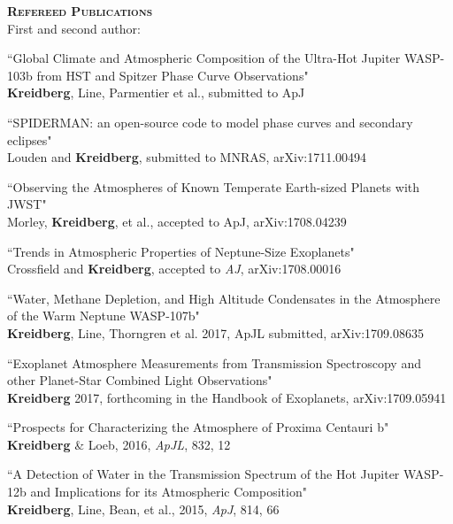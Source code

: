 \documentclass[12pt,letterpaper]{article}
\begin{document}
\textbf{\textsc{Refereed Publications}} \\
\vspace{1mm}
\hspace*{5mm}First and second author:
\begin{compactenum}
\item ``Global Climate and Atmospheric Composition of the Ultra-Hot Jupiter WASP-103b from HST and Spitzer Phase Curve Observations"\\
\textbf{Kreidberg}, Line, Parmentier et al., submitted to ApJ

\item ``SPIDERMAN: an open-source code to model phase curves and secondary eclipses"\\
Louden and \textbf{Kreidberg}, submitted to MNRAS, arXiv:1711.00494

\item ``Observing the Atmospheres of Known Temperate Earth-sized Planets with JWST"\\
Morley, \textbf{Kreidberg}, et al., accepted to ApJ, arXiv:1708.04239

\item ``Trends in Atmospheric Properties of Neptune-Size Exoplanets"\\
Crossfield and \textbf{Kreidberg}, accepted to \textit{AJ}, arXiv:1708.00016

\item ``Water, Methane Depletion, and High Altitude Condensates in the Atmosphere of the Warm Neptune WASP-107b"\\
\textbf{Kreidberg}, Line, Thorngren et al. 2017, ApJL submitted, arXiv:1709.08635

\item ``Exoplanet Atmosphere Measurements from Transmission Spectroscopy and other Planet-Star Combined Light Observations"\\
\textbf{Kreidberg} 2017, forthcoming in the Handbook of Exoplanets, arXiv:1709.05941

\item ``Prospects for Characterizing the Atmosphere of Proxima Centauri b"\\
\textbf{Kreidberg} \& Loeb, 2016, \textit{ApJL}, 832, 12 

\item ``A Detection of Water in the Transmission Spectrum of the Hot Jupiter WASP-12b and Implications for its Atmospheric Composition"\\
\textbf{Kreidberg}, Line,  Bean, et al., 2015, \textit{ApJ}, 814, 66


\end{compactenum}
\end{document}
